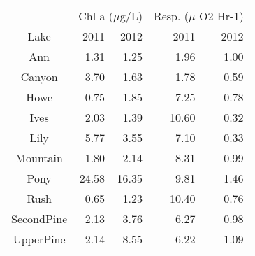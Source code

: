 \begin{table}[ht]
\centering
\begin{tabular}{crrrr}
  \hline
\hline
  & \multicolumn{2}{c}{Chl a ($\mu$g/L)} & 
                      \multicolumn{2}{c}{Resp. ($\mu$ O2 Hr-1)} \\
 Lake & 2011 & 2012 & 2011 & 2012 \\
 \hline
Ann & 1.31 & 1.25 & 1.96 & 1.00 \\ 
  Canyon & 3.70 & 1.63 & 1.78 & 0.59 \\ 
  Howe & 0.75 & 1.85 & 7.25 & 0.78 \\ 
  Ives & 2.03 & 1.39 & 10.60 & 0.32 \\ 
  Lily & 5.77 & 3.55 & 7.10 & 0.33 \\ 
  Mountain & 1.80 & 2.14 & 8.31 & 0.99 \\ 
  Pony & 24.58 & 16.35 & 9.81 & 1.46 \\ 
  Rush & 0.65 & 1.23 & 10.40 & 0.76 \\ 
  SecondPine & 2.13 & 3.76 & 6.27 & 0.98 \\ 
  UpperPine & 2.14 & 8.55 & 6.22 & 1.09 \\ 
   \hline
\end{tabular}
\end{table}
